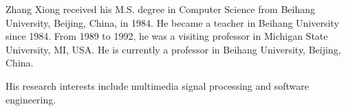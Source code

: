 \documentclass[journal]{IEEEtran}
\begin{document}
\begin{IEEEbiography}{Zhang Xiong}
    received his M.S. degree in Computer Science from Beihang University, Beijing, China, in 1984.
    He became a teacher in Beihang University since 1984. From 1989 to 1992, he was a visiting
    professor in Michigan State University, MI, USA. He is currently a professor in Beihang
    University, Beijing, China.  
    
    His research interests include multimedia signal processing and software engineering.
\end{IEEEbiography}
\end{document}

